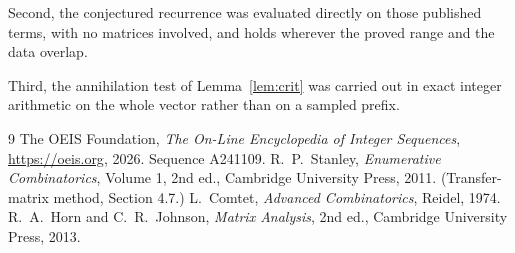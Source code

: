 \documentclass[11pt,a4paper]{article}
\theoremstyle{plain}
\theoremstyle{definition}
\begin{document}
Second, the conjectured recurrence was evaluated directly on those published terms, with no
matrices involved, and holds wherever the proved range and the data overlap.

Third, the annihilation test of Lemma~\ref{lem:crit} was carried out in exact integer
arithmetic on the whole vector rather than on a sampled prefix.

\begin{thebibliography}{9}
 The OEIS Foundation, \emph{The On-Line Encyclopedia of Integer
Sequences}, \url{https://oeis.org}, 2026. Sequence A241109.
 R.~P.~Stanley, \emph{Enumerative Combinatorics}, Volume 1, 2nd ed.,
Cambridge University Press, 2011. (Transfer-matrix method, Section 4.7.)
 L.~Comtet, \emph{Advanced Combinatorics}, Reidel, 1974.
 R.~A.~Horn and C.~R.~Johnson, \emph{Matrix Analysis}, 2nd ed., Cambridge
University Press, 2013.
\end{thebibliography}
\end{document}
